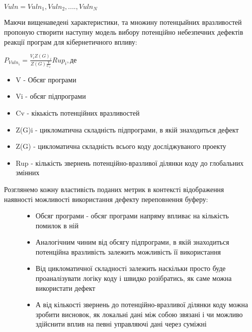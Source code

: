 $Vuln = {Vuln_1,Vuln_2,....,Vuln_N}$

Маючи вищенаведені характеристики, та множину потенцыйних вразливостей пропоную створити наступну модель вибору потенційно небезпечних дефектів реакції програм для кібернетичного впливу:

$P_{Vuln_i} = \frac{V_i Z(G)_i}{Z(G) \frac{V}{C_v}}Rup_i, де$
\begin{itemize}
\item {} 
V - Обсяг програми

\item {} 
Vi - обсяг підпрограми

\item {} 
Cv - кікькість потенційних вразливостей

\item {} 
Z(G)i - цикломатична складність підпрограми, в якій знаходиться дефект

\item {} 
Z(G) - цикломатична складність всього коду досліджуваного проекту

\item {} 
Rup - кількість звернень потенційно-вразливої ділянки коду до глобальних змінних

\end{itemize}
\begin{description}
\item[{Розглянемо кожну властивість поданих метрик в контексті відображення наявності можливості використання дефекту переповнення буферу:}] \leavevmode\begin{itemize}
\item {} 
Обсяг програми - обсяг програми напряму впливає на кількість помилок в ній

\item {} 
Аналогічним чиним від обсягу підпрограми, в якій знаходиться потенційна вразливість залежить можливість її використання

\item {} 
Від цикломатичної складності залежить наскільки просто буде проаналізувати логіку коду і швидко розібратись, як саме можна використати дефект

\item {} 
А від кількості звернень до потенційно-вразливої ділянки коду можна зробити висновок, як локальні дані між собою звязані і чи можливо здійснити вплив на певні управляючі дані через суміжні

\end{itemize}

\end{description}

